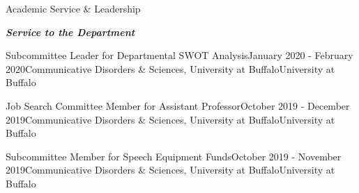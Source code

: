 \documentclass{resume} %
\begin{document}
\begin{rSection}{Academic Service \& Leadership}
\bigskip
\begin{center}
	{\bf \emph{Service to the Department}}
\end{center}


	\begin{rSubsection}{Subcommittee Leader for Departmental SWOT Analysis}{January 2020 - February 2020}{Communicative Disorders \& Sciences, University at Buffalo}{University at Buffalo}
	\end{rSubsection}

	\begin{rSubsection}{Job Search Committee Member for Assistant Professor}{October 2019 - December 2019}{Communicative Disorders \& Sciences, University at Buffalo}{University at Buffalo}
	\end{rSubsection}
	
	\begin{rSubsection}{Subcommittee Member for Speech Equipment Funds}{October 2019 - November 2019}{Communicative Disorders \& Sciences, University at Buffalo}{University at Buffalo}
	\end{rSubsection}


\end{rSection}

\end{document}
